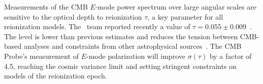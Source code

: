 Measurements of the \ac{CMB} $E$-mode power spectrum over large angular scales are sensitive to the optical depth 
to reionization $\tau$, a key parameter for all reionization models. 
The \planck\ team  reported recently a value of $\tau=0.055 \pm 0.009$~\cite{planck2016_xlvi,planck2016_xxxi}.
The level is lower than previous estimates and reduces the tension between CMB-based analyses and constraints from 
other astrophysical sources~\cite{Robertson:2015uda}.  
The CMB Probe's measurement of $E$-mode polarization will 
improve $\sigma(\tau)$ by a factor of 4.5, reaching the cosmic 
variance limit and setting stringent constraints on models of the reionization epoch. 



